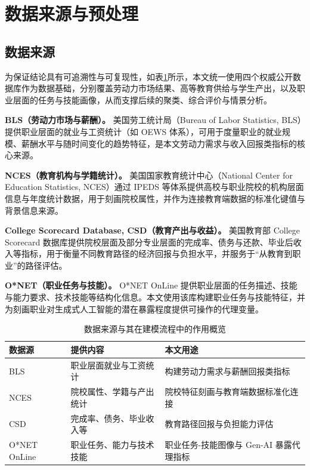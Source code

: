 \documentclass{mcmthesis}
\begin{document}
\section{数据来源与预处理}

\subsection{数据来源}
\noindent 为保证结论具有可追溯性与可复现性，如表\ref{tab:data_sources_cn}所示，本文统一使用四个权威公开数据库作为数据基础，分别覆盖劳动力市场结果、高等教育供给与学生产出，以及职业层面的任务与技能画像，从而支撑后续的聚类、综合评价与情景分析。

\noindent\textbf{BLS（劳动力市场与薪酬）。} 
美国劳工统计局（Bureau of Labor Statistics, BLS）提供职业层面的就业与工资统计（如 OEWS 体系），可用于度量职业的就业规模、薪酬水平与随时间变化的趋势特征，是本文劳动力需求与收入回报类指标的核心来源。

\noindent\textbf{NCES（教育机构与学籍统计）。} 美国国家教育统计中心（National Center for Education Statistics, NCES）通过 IPEDS 等体系提供高校与职业院校的机构层面信息与年度统计数据，用于刻画院校属性，并作为连接教育端数据的标准化键值与背景信息来源。

\noindent\textbf{College Scorecard Database, CSD（教育产出与收益）。} 美国教育部 College Scorecard 数据库提供院校层面及部分专业层面的完成率、债务与还款、毕业后收入等指标，用于衡量不同教育路径的经济回报与负担水平，并服务于“从教育到职业”的路径评估。

\noindent\textbf{O*NET（职业任务与技能）。} O*NET OnLine 提供职业层面的任务描述、技能与能力要求、技术技能等结构化信息。本文使用该库构建职业任务与技能特征，并为刻画职业对生成式人工智能的潜在暴露程度提供可操作的代理变量。

\begin{table}[htbp]
\centering
\caption{数据来源与其在建模流程中的作用概览}
\label{tab:data_sources_cn}
\renewcommand{\arraystretch}{1.15}
\setlength{\tabcolsep}{6pt}
\begin{tabularx}{\linewidth}{@{}l X X@{}}
\toprule
\textbf{数据源} & \textbf{提供内容} & \textbf{本文用途} \\
\midrule
BLS & 职业层面就业与工资统计 & 构建劳动力需求与薪酬回报类指标 \\
NCES & 院校属性、学籍与产出统计 & 院校特征刻画与教育端数据标准化连接 \\
CSD & 完成率、债务、毕业收入等 & 教育路径回报与负担能力评估 \\
O*NET OnLine & 职业任务、能力与技术技能 & 职业任务-技能图像与 Gen-AI 暴露代理指标 \\
\bottomrule
\end{tabularx}
\end{table}
\end{document}
